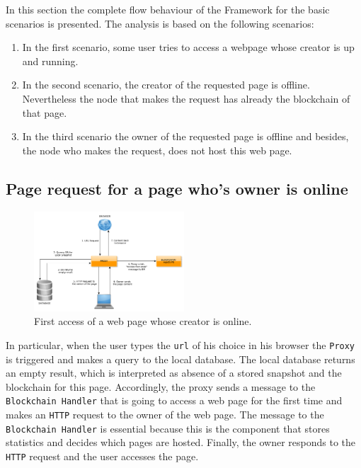 
In this section the complete flow behaviour of the Framework for the basic
scenarios is presented. The analysis is based on the following scenarios:

\begin{enumerate}
\item In the first scenario, some user tries to access a webpage whose creator is up and running.
\item In the second scenario, the creator of the requested page is offline.
Nevertheless the node that makes the request has already the blockchain of that page.
\item In the third scenario the owner of the requested page is offline and besides, the node who
makes the request, does not host this web page.
\end{enumerate}

\subsection{Page request for a page who's owner is online}

\begin{figure}[htp]
\center
\includegraphics[width=0.5\textwidth]{pictures/fetch_page_online_creator.pdf}
\caption{First access of a web page whose creator is online.}
\label{fig:online_creator}
\end{figure}

In particular, when the user types the \texttt{url} of his choice in his browser the \texttt{Proxy} is
triggered and makes a query to the local database. The local database returns an empty result,
which is interpreted as absence of a stored snapshot and the blockchain for this page.
Accordingly, the proxy sends a message to the \texttt{Blockchain Handler} that is going to access
a web page for the first time and makes an \texttt{HTTP} request to the owner of the web page.
The message to the \texttt{Blockchain Handler} is essential because this is the component that stores
statistics and decides which pages are hosted. Finally, the owner responds to the \texttt{HTTP} request
and the user accesses the page.

